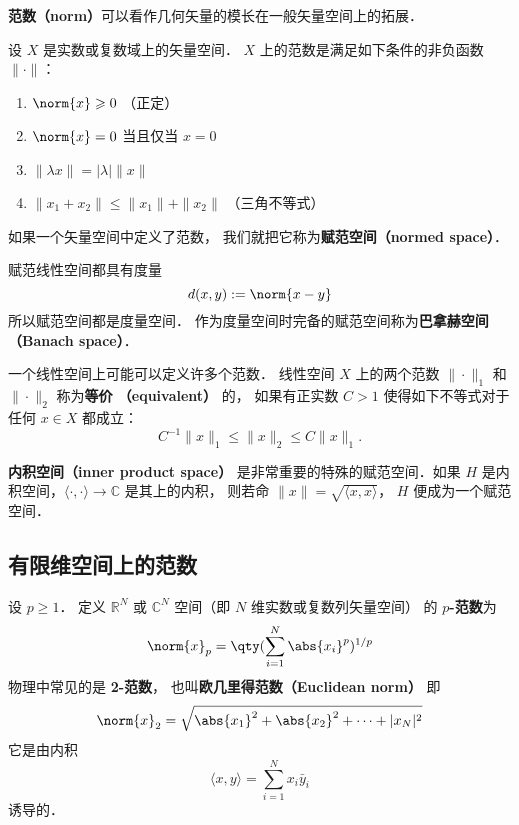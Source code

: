 

\textbf{范数（norm）}可以看作几何矢量的模长在一般矢量空间上的拓展．
\begin{definition}{}
设 $X$ 是实数或复数域上的矢量空间． $X$ 上的范数是满足如下条件的非负函数 $\|\cdot\|$：
\begin{enumerate}
\item $\norm{x} \geqslant 0$ （正定）
\item $\norm{x} = 0$ 当且仅当 $x = 0$
\item $\|\lambda x\| = |\lambda|\|x\|$
\item $\|x_1+x_2\| \leqslant \|x_1\|+ \|x_2\|$ （三角不等式）
\end{enumerate}
如果一个矢量空间中定义了范数， 我们就把它称为\textbf{赋范空间（normed space）}．
\end{definition}

赋范线性空间都具有度量
\begin{equation}
d(x,y) := \norm{x-y}
\end{equation}
所以赋范空间都是度量空间． 作为度量空间时完备的赋范空间称为\textbf{巴拿赫空间（Banach space）}．

一个线性空间上可能可以定义许多个范数． 线性空间 $X$ 上的两个范数 $\|\cdot\|_1$ 和 $\|\cdot\|_2$ 称为\textbf{等价 （equivalent）} 的， 如果有正实数 $C>1$ 使得如下不等式对于任何 $x\in X$ 都成立：
$$
C^{-1}\|x\|_{1}\leq\|x\|_2\leq C\|x\|_1.
$$

\textbf{内积空间（inner product space）} 是非常重要的特殊的赋范空间．如果 $H$ 是内积空间，$\langle\cdot,\cdot\rangle\to\mathbb C$ 是其上的内积， 则若命 $\|x\|=\sqrt{\langle x,x\rangle }$， $H$ 便成为一个赋范空间．

\subsection{有限维空间上的范数}
设 $p\geq1$． 定义 $\mathbb R^N$ 或 $\mathbb C^N$ 空间（即 $N$ 维实数或复数列矢量空间） 的 \textbf{$p$-范数}为
\begin{equation}
\norm{ x}_p = \qty(\sum_{i=1}^N \abs{x_i}^p)^{1/p}
\end{equation}
物理中常见的是 \textbf{2-范数}， 也叫\textbf{欧几里得范数（Euclidean norm）} 即
\begin{equation}
\norm{ x}_2 = \sqrt{\abs{x_1}^2 + \abs{x_2}^2 + \dots+|x_N|^2}
\end{equation}
它是由内积
$$
\langle x,y\rangle=\sum_{i=1}^Nx_i\bar y_i
$$
诱导的．

